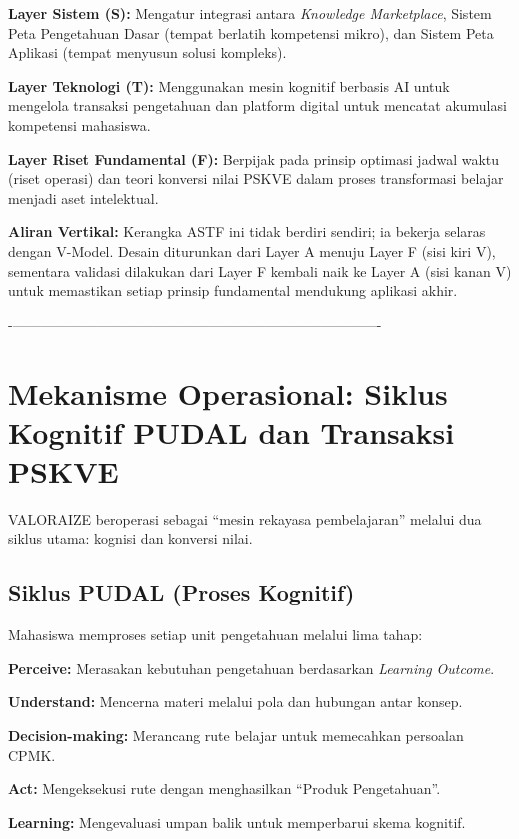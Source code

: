 \documentclass[
  letterpaper,
  DIV=11,
  numbers=noendperiod]{scrreprt}
\begin{document}
\textbf{Layer Sistem (S):} Mengatur integrasi antara \emph{Knowledge
Marketplace}, Sistem Peta Pengetahuan Dasar (tempat berlatih kompetensi
mikro), dan Sistem Peta Aplikasi (tempat menyusun solusi kompleks).

\textbf{Layer Teknologi (T):} Menggunakan mesin kognitif berbasis AI
untuk mengelola transaksi pengetahuan dan platform digital untuk
mencatat akumulasi kompetensi mahasiswa.

\textbf{Layer Riset Fundamental (F):} Berpijak pada prinsip optimasi
jadwal waktu (riset operasi) dan teori konversi nilai PSKVE dalam proses
transformasi belajar menjadi aset intelektual.

\textbf{Aliran Vertikal:} Kerangka ASTF ini tidak berdiri sendiri; ia
bekerja selaras dengan V-Model. Desain diturunkan dari Layer A menuju
Layer F (sisi kiri V), sementara validasi dilakukan dari Layer F kembali
naik ke Layer A (sisi kanan V) untuk memastikan setiap prinsip
fundamental mendukung aplikasi akhir.

-\/-------------------------------------------------------------------------------

\section{Mekanisme Operasional: Siklus Kognitif PUDAL dan Transaksi
PSKVE}\label{mekanisme-operasional-siklus-kognitif-pudal-dan-transaksi-pskve}

VALORAIZE beroperasi sebagai ``mesin rekayasa pembelajaran'' melalui dua
siklus utama: kognisi dan konversi nilai.

\subsection{Siklus PUDAL (Proses
Kognitif)}\label{siklus-pudal-proses-kognitif}

Mahasiswa memproses setiap unit pengetahuan melalui lima tahap:

\textbf{Perceive:} Merasakan kebutuhan pengetahuan berdasarkan
\emph{Learning Outcome}.

\textbf{Understand:} Mencerna materi melalui pola dan hubungan antar
konsep.

\textbf{Decision-making:} Merancang rute belajar untuk memecahkan
persoalan CPMK.

\textbf{Act:} Mengeksekusi rute dengan menghasilkan ``Produk
Pengetahuan''.

\textbf{Learning:} Mengevaluasi umpan balik untuk memperbarui skema
kognitif.
\end{document}
